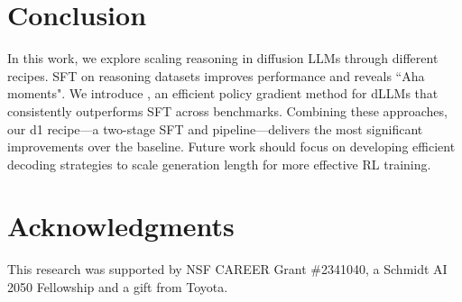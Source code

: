
\section{Conclusion}
\vspace{-3mm}

In this work, we explore scaling reasoning in diffusion LLMs through different recipes. SFT on reasoning datasets improves performance and reveals ``Aha moments". We introduce \grpo, an efficient policy gradient method for dLLMs that consistently outperforms SFT across benchmarks. Combining these approaches, our d1 recipe—a two-stage SFT and \grpo pipeline—delivers the most significant improvements over the baseline. Future work should focus on developing efficient decoding strategies to scale generation length for more effective RL training.

\section*{Acknowledgments}
This research was supported by NSF CAREER Grant \#2341040, a Schmidt AI 2050 Fellowship
and a gift from Toyota.
